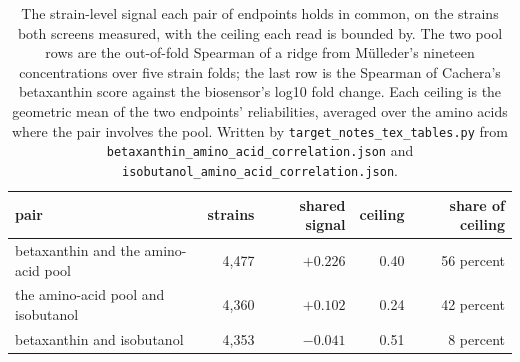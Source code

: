 \begin{table}[H]
  \centering
  \footnotesize
  \caption[The endpoint matrix]{The strain-level signal each pair of endpoints holds in common, on the strains both screens measured, with the ceiling each read is bounded by. The two pool rows are the out-of-fold Spearman of a ridge from M\"ulleder's nineteen concentrations over five strain folds; the last row is the Spearman of Cachera's betaxanthin score against the biosensor's log10 fold change. Each ceiling is the geometric mean of the two endpoints' reliabilities, averaged over the amino acids where the pair involves the pool. Written by \texttt{target\_notes\_tex\_tables.py} from \texttt{betaxanthin\_amino\_acid\_correlation.json} and \texttt{isobutanol\_amino\_acid\_correlation.json}.}
  \label{tab:endpoint-matrix}
  \begin{tabular}{@{}lrrrr@{}}
    \hline
    pair & strains & shared signal & ceiling & share of ceiling \\
    \hline
    betaxanthin and the amino-acid pool & 4,477 & $+0.226$ & 0.40 & 56 percent \\
    the amino-acid pool and isobutanol & 4,360 & $+0.102$ & 0.24 & 42 percent \\
    betaxanthin and isobutanol & 4,353 & $-0.041$ & 0.51 & 8 percent \\
    \hline
  \end{tabular}
\end{table}
